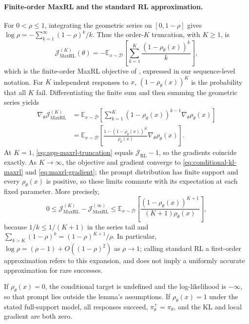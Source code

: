 \paragraph{Finite-order MaxRL and the standard RL approximation.}
For $0<\rho\le1$, integrating the geometric series on $[0,1-\rho]$
gives $\log\rho=-\sum_{k=1}^{\infty}(1-\rho)^k/k$.
Thus the order-$K$ truncation, with $K\ge1$, is
\begin{equation}
 \mathcal J_{\mathrm{MaxRL}}^{(K)}(\theta)
 =-\mathbb E_{x\sim\mathcal D}
       \left[\sum_{k=1}^{K}\frac{(1-\rho_\theta(x))^k}{k}\right],
 \label{eq:app-maxrl-truncation}
\end{equation}
which is the finite-order MaxRL objective of
\citet{tajwar_maximum_2026}, expressed in our sequence-level notation.
For $K$ independent responses to $x$, $(1-\rho_\theta(x))^K$ is the
probability that all $K$ fail. Differentiating the finite sum and then
summing the geometric series yields
\begin{align}
 \nabla_\theta\mathcal J_{\mathrm{MaxRL}}^{(K)}
 &=\mathbb E_{x\sim\mathcal D}
       \left[\sum_{k=1}^{K}(1-\rho_\theta(x))^{k-1}
                         \nabla_\theta\rho_\theta(x)\right]
 \nonumber\\
 &=\mathbb E_{x\sim\mathcal D}
       \left[\frac{1-(1-\rho_\theta(x))^K}{\rho_\theta(x)}
                         \nabla_\theta\rho_\theta(x)\right].
 \label{eq:app-maxrl-truncated-gradient}
\end{align}
At $K=1$, \eqref{eq:app-maxrl-truncation} equals
$\mathcal J_{\mathrm{RL}}-1$, so the gradients coincide exactly.
As $K\to\infty$, the objective and gradient converge to
\eqref{eq:conditional-kl-maxrl} and \eqref{eq:maxrl-gradient}; the prompt
distribution has finite support and every $\rho_\theta(x)$ is positive,
so these limits commute with its expectation at each fixed parameter.
More precisely,
\begin{equation}
 0\le\mathcal J_{\mathrm{MaxRL}}^{(K)}
             -\mathcal J_{\mathrm{MaxRL}}^{(\infty)}
 \le\mathbb E_{x\sim\mathcal D}
       \left[\frac{(1-\rho_\theta(x))^{K+1}}
                    {(K+1)\rho_\theta(x)}\right],
 \label{eq:app-maxrl-truncation-error}
\end{equation}
because $1/k\le1/(K+1)$ in the series tail and
$\sum_{k>K}(1-\rho)^k=(1-\rho)^{K+1}/\rho$.
In particular, $\log\rho=(\rho-1)+O((1-\rho)^2)$ as $\rho\to1$;
calling standard RL a first-order approximation refers to this expansion,
and does not imply a uniformly accurate approximation for rare successes.

If $\rho_\theta(x)=0$, the conditional target is undefined and the
log-likelihood is $-\infty$, so that prompt lies outside the lemma's
assumptions. If $\rho_\theta(x)=1$ under the stated full-support model,
all responses succeed, $\pi_\theta^+=\pi_\theta$, and the KL and local
gradient are both zero.
